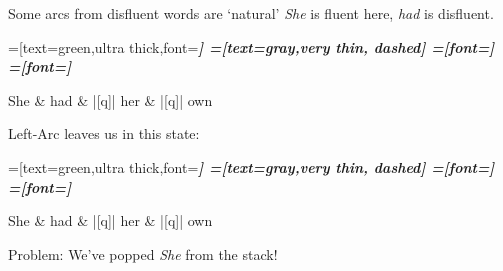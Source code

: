 \documentclass[color=usenames,dvipsnames]{lecture}
\begin{document}
\begin{plain}{Some arcs from disfluent words are `natural'}
\emph{She} is fluent here, \emph{had} is disfluent.
\begin{center}
\begin{dependency}[theme=simple]
    =[text=green,ultra thick,font=\bfseries\itshape]
    =[text=gray,very thin, dashed]
    =[font=\bfseries\itshape]
    =[font=\itshape]
    \begin{deptext}[column sep=.075cm, row sep=.1ex]
    She \& had \& |[q]| her \& |[q]| own \\
    \end{deptext}
\end{dependency}
\end{center}
Left-Arc leaves us in this state:\\
\begin{center}
\begin{dependency}[theme=simple]
    =[text=green,ultra thick,font=\bfseries\itshape]
    =[text=gray,very thin, dashed]
    =[font=\bfseries\itshape]
    =[font=\itshape]
    \begin{deptext}[column sep=.075cm, row sep=.1ex]
    She \& had \& |[q]| her \& |[q]| own \\
    \end{deptext}
\end{dependency}
\end{center}

Problem: We've popped \emph{She} from the stack!\\
\end{plain}
\end{document}
